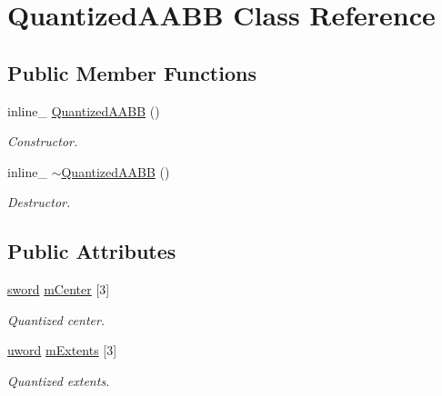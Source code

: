 \hypertarget{class_quantized_a_a_b_b}{\section{Quantized\+A\+A\+B\+B Class Reference}
\label{class_quantized_a_a_b_b}
}
\subsection*{Public Member Functions}
\begin{DoxyCompactItemize}
\item 
\hypertarget{class_quantized_a_a_b_b_acba71e9ef587ad3e66fab9806b03fa7a}{inline\+\_\+ \hyperlink{class_quantized_a_a_b_b_acba71e9ef587ad3e66fab9806b03fa7a}{Quantized\+A\+A\+B\+B} ()}\label{class_quantized_a_a_b_b_acba71e9ef587ad3e66fab9806b03fa7a}

\begin{DoxyCompactList}\small\item\em Constructor. \end{DoxyCompactList}\item 
\hypertarget{class_quantized_a_a_b_b_ab0e4d87bb36b8c3c5efdb7f7bfe436aa}{inline\+\_\+ \hyperlink{class_quantized_a_a_b_b_ab0e4d87bb36b8c3c5efdb7f7bfe436aa}{$\sim$\+Quantized\+A\+A\+B\+B} ()}\label{class_quantized_a_a_b_b_ab0e4d87bb36b8c3c5efdb7f7bfe436aa}

\begin{DoxyCompactList}\small\item\em Destructor. \end{DoxyCompactList}\end{DoxyCompactItemize}
\subsection*{Public Attributes}
\begin{DoxyCompactItemize}
\item 
\hypertarget{class_quantized_a_a_b_b_a66740f7547d4ebd8bdfe9543da56787e}{\hyperlink{_ice_types_8h_a4f39f3859910e22cf5f7ab0307882e3f}{sword} \hyperlink{class_quantized_a_a_b_b_a66740f7547d4ebd8bdfe9543da56787e}{m\+Center} \mbox{[}3\mbox{]}}\label{class_quantized_a_a_b_b_a66740f7547d4ebd8bdfe9543da56787e}

\begin{DoxyCompactList}\small\item\em Quantized center. \end{DoxyCompactList}\item 
\hypertarget{class_quantized_a_a_b_b_a3eea12a3576e9824a68049904be04df6}{\hyperlink{_ice_types_8h_a42fa576a6a3b73c1efc32ab91d176300}{uword} \hyperlink{class_quantized_a_a_b_b_a3eea12a3576e9824a68049904be04df6}{m\+Extents} \mbox{[}3\mbox{]}}\label{class_quantized_a_a_b_b_a3eea12a3576e9824a68049904be04df6}

\begin{DoxyCompactList}\small\item\em Quantized extents. \end{DoxyCompactList}\end{DoxyCompactItemize}


